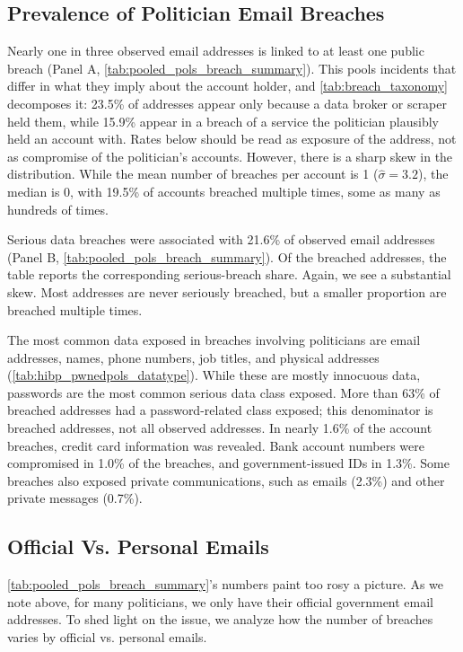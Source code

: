 \documentclass[12pt, letterpaper]{article}
\begin{document}
\subsection{Prevalence of Politician Email Breaches}
Nearly one in three observed email addresses is linked to at least one public breach (Panel A, \cref{tab:pooled_pols_breach_summary}). This pools incidents that differ in what they imply about the account holder, and \cref{tab:breach_taxonomy} decomposes it: 23.5\% of addresses appear only because a data broker or scraper held them, while 15.9\% appear in a breach of a service the politician plausibly held an account with. Rates below should be read as exposure of the address, not as compromise of the politician's accounts. However, there is a sharp skew in the distribution. While the mean number of breaches per account is 1 ($\hat{\sigma} = 3.2$), the median is 0, with 19.5\% of accounts breached multiple times, some as many as hundreds of times.

Serious data breaches were associated with 21.6\% of observed email addresses (Panel B, \cref{tab:pooled_pols_breach_summary}). Of the breached addresses, the table reports the corresponding serious-breach share. Again, we see a substantial skew. Most addresses are never seriously breached, but a smaller proportion are breached multiple times.





The most common data exposed in breaches involving politicians are email addresses, names, phone numbers, job titles, and physical addresses (\cref{tab:hibp_pwnedpols_datatype}). While these are mostly innocuous data, passwords are the most common serious data class exposed. More than 63\% of breached addresses had a password-related class exposed; this denominator is breached addresses, not all observed addresses. In nearly 1.6\% of the account breaches, credit card information was revealed. Bank account numbers were compromised in 1.0\% of the breaches, and government-issued IDs in 1.3\%. Some breaches also exposed private communications, such as emails (2.3\%) and other private messages (0.7\%).

\subsection{Official Vs. Personal Emails}
\cref{tab:pooled_pols_breach_summary}'s numbers paint too rosy a picture. As we note above, for many politicians, we only have their official government email addresses. To shed light on the issue, we analyze how the number of breaches varies by official vs. personal emails.
\end{document}

